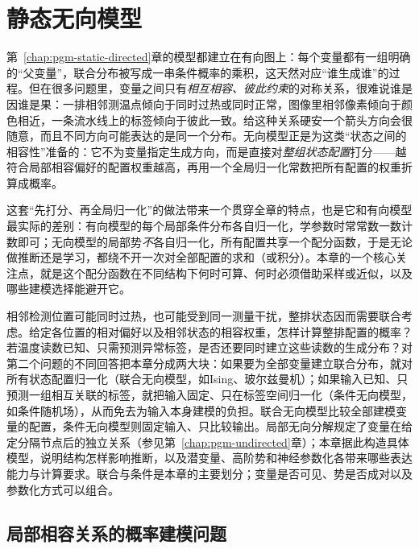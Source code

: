 \chapter{静态无向模型}
\label{chap:pgm-energy-models}

第~\ref{chap:pgm-static-directed}章的模型都建立在有向图上：每个变量都有一组明确的“父变量”，联合分布被写成一串条件概率的乘积，这天然对应“谁生成谁”的过程。但在很多问题里，变量之间只有\emph{相互相容、彼此约束}的对称关系，很难说谁是因谁是果：一排相邻测温点倾向于同时过热或同时正常，图像里相邻像素倾向于颜色相近，一条流水线上的标签倾向于彼此一致。给这种关系硬安一个箭头方向会很随意，而且不同方向可能表达的是同一个分布。无向模型正是为这类“状态之间的相容性”准备的：它不为变量指定生成方向，而是直接对\emph{整组状态配置}打分——越符合局部相容偏好的配置权重越高，再用一个全局归一化常数把所有配置的权重折算成概率。

这套“先打分、再全局归一化”的做法带来一个贯穿全章的特点，也是它和有向模型最实际的差别：有向模型的每个局部条件分布各自归一化，学参数时常常数一数计数即可；无向模型的局部势\emph{不}各自归一化，所有配置共享一个配分函数，于是无论做推断还是学习，都绕不开一次对全部配置的求和（或积分）。本章的一个核心关注点，就是这个配分函数在不同结构下何时可算、何时必须借助采样或近似，以及哪些建模选择能避开它。

相邻检测位置可能同时过热，也可能受到同一测量干扰，整排状态因而需要联合考虑。给定各位置的相对偏好以及相邻状态的相容权重，怎样计算整排配置的概率？若温度读数已知、只需预测异常标签，是否还要同时建立这些读数的生成分布？对第二个问题的不同回答把本章分成两大块：如果要为全部变量建立联合分布，就对所有状态配置归一化（联合无向模型，如Ising、玻尔兹曼机）；如果输入已知、只预测一组相互关联的标签，就把输入固定、只在标签空间归一化（条件无向模型，如条件随机场），从而免去为输入本身建模的负担。联合无向模型比较全部建模变量的配置，条件无向模型则固定输入、只比较输出。局部无向分解规定了变量在给定分隔节点后的独立关系（参见第~\ref{chap:pgm-undirected}章）；本章据此构造具体模型，说明结构怎样影响推断，以及潜变量、高阶势和神经参数化各带来哪些表达能力与计算要求。联合与条件是本章的主要划分；变量是否可见、势是否成对以及参数化方式可以组合。

\section{局部相容关系的概率建模问题}
\label{sec:pgm-energy-models-common}

